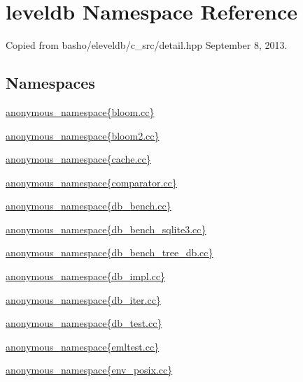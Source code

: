 \hypertarget{namespaceleveldb}{}\section{leveldb Namespace Reference}
\label{namespaceleveldb}


Copied from basho/eleveldb/c\+\_\+src/detail.\+hpp September 8, 2013.  


\subsection*{Namespaces}
\begin{DoxyCompactItemize}
\item 
 \hyperlink{namespaceleveldb_1_1anonymous__namespace_02bloom_8cc_03}{anonymous\+\_\+namespace\{bloom.\+cc\}}
\item 
 \hyperlink{namespaceleveldb_1_1anonymous__namespace_02bloom2_8cc_03}{anonymous\+\_\+namespace\{bloom2.\+cc\}}
\item 
 \hyperlink{namespaceleveldb_1_1anonymous__namespace_02cache_8cc_03}{anonymous\+\_\+namespace\{cache.\+cc\}}
\item 
 \hyperlink{namespaceleveldb_1_1anonymous__namespace_02comparator_8cc_03}{anonymous\+\_\+namespace\{comparator.\+cc\}}
\item 
 \hyperlink{namespaceleveldb_1_1anonymous__namespace_02db__bench_8cc_03}{anonymous\+\_\+namespace\{db\+\_\+bench.\+cc\}}
\item 
 \hyperlink{namespaceleveldb_1_1anonymous__namespace_02db__bench__sqlite3_8cc_03}{anonymous\+\_\+namespace\{db\+\_\+bench\+\_\+sqlite3.\+cc\}}
\item 
 \hyperlink{namespaceleveldb_1_1anonymous__namespace_02db__bench__tree__db_8cc_03}{anonymous\+\_\+namespace\{db\+\_\+bench\+\_\+tree\+\_\+db.\+cc\}}
\item 
 \hyperlink{namespaceleveldb_1_1anonymous__namespace_02db__impl_8cc_03}{anonymous\+\_\+namespace\{db\+\_\+impl.\+cc\}}
\item 
 \hyperlink{namespaceleveldb_1_1anonymous__namespace_02db__iter_8cc_03}{anonymous\+\_\+namespace\{db\+\_\+iter.\+cc\}}
\item 
 \hyperlink{namespaceleveldb_1_1anonymous__namespace_02db__test_8cc_03}{anonymous\+\_\+namespace\{db\+\_\+test.\+cc\}}
\item 
 \hyperlink{namespaceleveldb_1_1anonymous__namespace_02emltest_8cc_03}{anonymous\+\_\+namespace\{emltest.\+cc\}}
\item 
 \hyperlink{namespaceleveldb_1_1anonymous__namespace_02env__posix_8cc_03}{anonymous\+\_\+namespace\{env\+\_\+posix.\+cc\}}

\end{DoxyCompactItemize}
